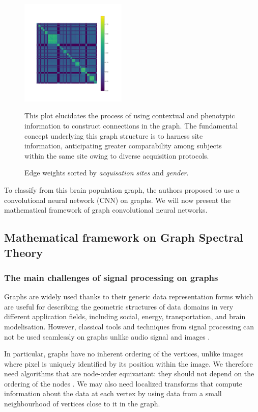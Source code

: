 \begin{figure}[h!]
    \centering
    \includegraphics[width=0.45\textwidth]{figures/sorted_adjacency_by_site_id_by_sex.png}
    \caption{Edge weights sorted by \textit{acquisation sites} and \textit{gender}.} This plot elucidates the process of using contextual and phenotypic information to construct connections in the graph. The fundamental concept underlying this graph structure is to harness site information, anticipating greater comparability among subjects within the same site owing to diverse acquisition protocols.
    \Description{}
    \label{fig:sorted_adjacency}
\end{figure}

To classify from this brain population graph, the authors \cite{Parisot17} proposed to use a convolutional neural network (CNN) on graphs. We will now present the mathematical framework of graph convolutional neural networks.

\subsection{Mathematical framework on Graph Spectral Theory}
\subsubsection{The main challenges of signal processing on graphs} 

Graphs are widely used thanks to their generic data representation forms which are useful for describing the geometric structures of data domains in very different application fields, including social, energy, transportation, and brain modelisation.
However, classical tools and techniques from signal processing can not be used seamlessly on graphs unlike audio signal and images \cite{shuman_emerging_2013}.

In particular, graphs have no inherent ordering of the vertices, unlike images where pixel is uniquely identified by its position within the image. We therefore need algorithms that are node-order equivariant: they should not depend on the ordering of the nodes \cite{daigavane_understanding_2021}. We may also need localized transforms that compute information about the data at each vertex by using data from a small neighbourhood of vertices close to it in the graph.

